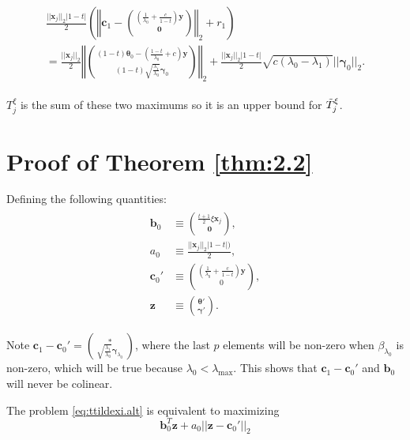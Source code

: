 \begin{gather}
    \begin{aligned}
        \frac{||\boldsymbol x_j||_2|1-t|}{2}\left(\left\Vert\boldsymbol c_1-\binom{(\frac{1}{\lambda_0}+\frac{c}{1-t})\boldsymbol y}{\boldsymbol 0}\right\Vert_2+r_1\right)\\
        =\frac{||\boldsymbol x_j||_2}{2}\left\Vert\binom{(1-t)\boldsymbol\theta_{0}-\left(\frac{1-t}{\lambda_0}+c\right)\boldsymbol y}{(1-t)\sqrt{\frac{\lambda_1}{\lambda_0}}\boldsymbol\gamma_{0}}\right\Vert_2+\frac{||\boldsymbol x_j||_2|1-t|}{2}\sqrt{c(\lambda_0-\lambda_1)}||\boldsymbol\gamma_0||_2.
    \end{aligned}
\end{gather}

$T^\xi_j$ is the sum of these two maximums so it is an upper bound for $\Tilde{T}^\xi_j$.

\iffalse
\section{Proof of Theorem \ref{thm:2.2}}

Defining the following quantities:
\begin{gather}
    \begin{aligned}
        \boldsymbol b_0&\equiv\binom{\frac{t+1}{2}\xi \boldsymbol x_j}{\boldsymbol 0},\\
        a_0&\equiv\frac{||\boldsymbol x_j||_2|1-t|)}{2},\\
        \boldsymbol c_0'&\equiv\binom{\left(\frac{1}{\lambda_0}+\frac{c}{1-t}\right)\boldsymbol y}{0},\\
        \boldsymbol z &\equiv \binom{\boldsymbol\theta'}{\boldsymbol\gamma'}.
    \end{aligned}
\end{gather}

Note $\boldsymbol c_1-\boldsymbol c_0'=\binom{*}{\sqrt{\frac{\lambda_1}{\lambda_0}}\boldsymbol\gamma_{\lambda_0}}$, where the last $p$ elements will be non-zero when $\beta_{\lambda_0}$ is non-zero, which will be true because $\lambda_0<\lambda_{\max}$. This shows that $\boldsymbol c_1-\boldsymbol c_0'$ and $\boldsymbol b_0$ will never be colinear.

The problem \eqref{eq:ttildexi.alt} is equivalent to maximizing
\begin{equation}
    \label{eq:2.2.1}
    \boldsymbol b_0^T\boldsymbol z+a_0||\boldsymbol z-\boldsymbol c_0'||_2
\end{equation}

